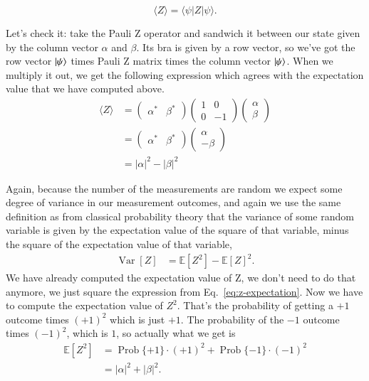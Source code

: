 \begin{equation}
\langle Z\rangle=\langle\psi|Z| \psi\rangle.
\end{equation}

Let's check it: take the Pauli Z operator and sandwich it between our state given by the column vector $\alpha$ and $\beta$. Its bra is given by a row vector, so we've got the row vector $\ket{\psi}$ times Pauli Z matrix times the column vector $\ket{\psi}$. When we multiply it out, we get the following expression which agrees with the expectation value that we have computed above.
\begin{equation}
\begin{aligned}
\langle Z\rangle &=\left(\begin{array}{ll}
\alpha^{*} & \beta^{*}
\end{array}\right)\left(\begin{array}{cc}
1 & 0 \\
0 & -1
\end{array}\right)\left(\begin{array}{l}
\alpha \\
\beta
\end{array}\right) \\
&=\left(\begin{array}{ll}
\alpha^{*} & \beta^{*}
\end{array}\right)\left(\begin{array}{c}
\alpha \\
-\beta
\end{array}\right) \\
&=|\alpha|^{2}-|\beta|^{2}
\end{aligned}
\label{eq:z-expectation}
\end{equation}

Again, because the number of the measurements are random we expect some degree of variance in our measurement outcomes, and again we use the same definition as from classical probability theory that the variance of some random variable is given by the expectation value of the square of that variable, minus the square of the expectation value of that variable,
\begin{equation}
\begin{aligned}
\operatorname{Var}[Z] &=\mathbb{E}\left[Z^{2}\right]-\mathbb{E}[Z]^{2}.    
\end{aligned}
\end{equation}
We have already computed the expectation value of Z, we don't need to do that anymore, we just square the expression from Eq.~\ref{eq:z-expectation}. Now we have to compute the expectation value of $Z^2$. That's the probability of getting a $+1$ outcome times $(+1)^2$ which is just $+1$.  The probability of the $-1$ outcome times $(-1)^2$, which is $1$, so actually what we get is
\begin{equation}
\begin{aligned}
\mathbb{E}\left[Z^{2}\right] &=\operatorname{Prob}\{+1\} \cdot(+1)^{2}+\operatorname{Prob}\{-1\} \cdot(-1)^{2} \\
&=|\alpha|^{2}+|\beta|^{2}.
\end{aligned}
\end{equation}

